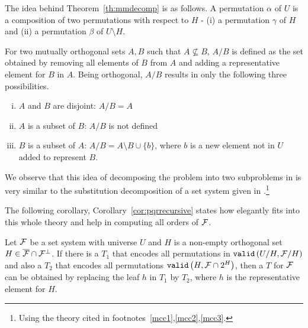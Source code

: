 \def \ff {\overline{\cF} \cap \cF^{\bot}}
The idea behind Theorem~\ref{th:mmdecomp} is as follows. A permutation $\alpha$
of $U$ is a composition of two permutations with respect to $H$ - (i) a
permutation $\gamma$ of $H$ and (ii) a permutation $\beta$ of $U
\setminus H$.

For two mutually orthogonal sets $A, B$ such that $A \nsubseteq B$,
$A/B$ is defined as the set obtained by removing all elements of $B$
from $A$ and adding a representative element for $B$ in $A$. Being orthogonal,
$A/B$ results in only the following three possibilities.
\begin{enumerate}[i. ]
\item $A$ and $ B$ are disjoint: $A/B  = A$
\item $A$ is a subset of $B$: $A/B$ is not defined
\item $B$ is a subset of $A$: $A/B = A \setminus B \cup \{b\}$, where $b$
is a new element not in $U$ added to represent $B$.
\end{enumerate}

We observe that this idea of decomposing the \COP problem into two
subproblems in \cite{mm96} is very similar to the substitution
decomposition of a set system given in \cite[Sec.~4]{mcc04}.\footnote{Using
  the theory cited in footnotes~\ref{mcc1},\ref{mcc2},\ref{mcc3}.}

The following corollary, Corollary~\ref{cor:pqrrecursive} states how
\PQRtree elegantly fits into this whole theory and help in computing
all \COP orders of ${\cal F}$.

\begin{corollary}[{\cite[Cor.~8]{mm96}}]
  \label{cor:pqrrecursive}
  Let ${\cal F}$ be a set system with universe $U$ and $H$ is a non-empty
  orthogonal set $H \in \ff$. If there is a \PQRtree $T_1$ that
  encodes all permutations in ${\tt valid}\left(U/H, {\cal F}/H\right)$ and also a \PQRtree
  $T_2$ that encodes all permutations ${\tt valid}\left(H,{\cal F} \cap 2^{H}\right)$,
  then a \PQRtree $T$ for ${\cal F}$ can be obtained by replacing the leaf
  $h$ in $T_1$ by $T_2$, where $h$ is the representative element for $H$.
\end{corollary}


